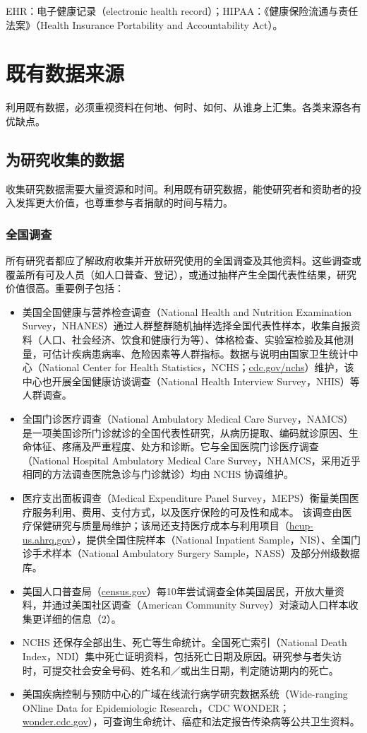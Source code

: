 EHR：电子健康记录（electronic health record）；HIPAA：《健康保险流通与责任法案》（Health Insurance Portability and Accountability Act）。
\endgroup

\section{既有数据来源}
利用既有数据，必须重视资料在何地、何时、如何、从谁身上汇集。各类来源各有优缺点。
\subsection{为研究收集的数据}
收集研究数据需要大量资源和时间。利用既有研究数据，能使研究者和资助者的投入发挥更大价值，也尊重参与者捐献的时间与精力。

\subsubsection{全国调查}
所有研究者都应了解政府收集并开放研究使用的全国调查及其他资料。这些调查或覆盖所有可及人员（如人口普查、登记），或通过抽样产生全国代表性结果，研究价值很高。重要例子包括：
\begin{itemize}
\item 美国全国健康与营养检查调查（National Health and Nutrition Examination Survey，NHANES）通过人群整群随机抽样选择全国代表性样本，收集自报资料（人口、社会经济、饮食和健康行为等）、体格检查、实验室检验及其他测量，可估计疾病患病率、危险因素等人群指标。数据与说明由国家卫生统计中心（National Center for Health Statistics，NCHS；\url{cdc.gov/nchs}）维护，该中心也开展全国健康访谈调查（National Health Interview Survey，NHIS）等人群调查。
\item 全国门诊医疗调查（National Ambulatory Medical Care Survey，NAMCS）是一项美国诊所门诊就诊的全国代表性研究，从病历提取、编码就诊原因、生命体征、疼痛及严重程度、处方和诊断。它与全国医院门诊医疗调查（National Hospital Ambulatory Medical Care Survey，NHAMCS，采用近乎相同的方法调查医院急诊与门诊就诊）均由 NCHS 协调维护。
\item 医疗支出面板调查（Medical Expenditure Panel Survey，MEPS）衡量美国医疗服务利用、费用、支付方式，以及医疗保险的可及性和成本。
该调查由医疗保健研究与质量局维护；该局还支持医疗成本与利用项目（\url{hcup-us.ahrq.gov}），提供全国住院样本（National Inpatient Sample，NIS）、全国门诊手术样本（National Ambulatory Surgery Sample，NASS）及部分州级数据库。
\item 美国人口普查局（\url{census.gov}）每10年尝试调查全体美国居民，开放大量资料，并通过美国社区调查（American Community Survey）对滚动人口样本收集更详细的信息（2）。
\item NCHS 还保存全部出生、死亡等生命统计。全国死亡索引（National Death Index，NDI）集中死亡证明资料，包括死亡日期及原因。研究参与者失访时，可提交社会安全号码、姓名和／或出生日期，判定随访期内的死亡。
\item 美国疾病控制与预防中心的广域在线流行病学研究数据系统（Wide-ranging ONline Data for Epidemiologic Research，CDC WONDER；\url{wonder.cdc.gov}），可查询生命统计、癌症和法定报告传染病等公共卫生资料。
\end{itemize}


